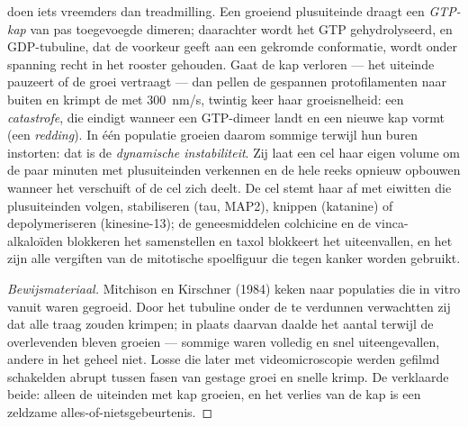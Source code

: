 \begin{definition}\label{def:b3:cytoskeleton-motility:instability}
 doen iets vreemders dan treadmilling. Een groeiend
plusuiteinde draagt een \emph{GTP-kap} van pas toegevoegde dimeren;
daarachter wordt het GTP gehydrolyseerd, en GDP-tubuline, dat de
voorkeur geeft aan een gekromde conformatie, wordt onder spanning recht
in het rooster gehouden. Gaat de kap verloren --- het uiteinde pauzeert
of de groei vertraagt --- dan pellen de gespannen protofilamenten naar
buiten en krimpt de  met \qty{300}{nm/s}, twintig keer haar
groeisnelheid: een \emph{catastrofe}, die eindigt wanneer een
GTP-dimeer landt en een nieuwe kap vormt (een \emph{redding}). In één
populatie groeien daarom sommige  terwijl hun buren
instorten: dat is de \emph{dynamische instabiliteit}. Zij laat een cel
haar eigen volume om de paar minuten met plusuiteinden verkennen en de
hele reeks opnieuw opbouwen wanneer het  verschuift of de cel
zich deelt. De cel stemt haar af met eiwitten die plusuiteinden volgen,
 stabiliseren (tau, MAP2), knippen (katanine) of
depolymeriseren (kinesine-13); de geneesmiddelen colchicine en de
vinca-alkaloïden blokkeren het samenstellen en taxol blokkeert het
uiteenvallen, en het zijn alle vergiften van de mitotische spoelfiguur
die tegen kanker worden gebruikt.
\end{definition}

\begin{proof}[Bewijsmateriaal]
Mitchison en Kirschner (1984) keken naar populaties  die in
vitro vanuit  waren gegroeid. Door het tubuline onder de
 te verdunnen verwachtten zij dat alle
 traag zouden krimpen; in plaats daarvan daalde het aantal
 terwijl de overlevenden bleven groeien --- sommige waren
volledig en snel uiteengevallen, andere in het geheel niet. Losse
 die later met videomicroscopie werden gefilmd schakelden
abrupt tussen fasen van gestage groei en snelle krimp. De 
verklaarde beide: alleen de uiteinden met kap groeien, en het verlies
van de kap is een zeldzame alles-of-nietsgebeurtenis.
\end{proof}

